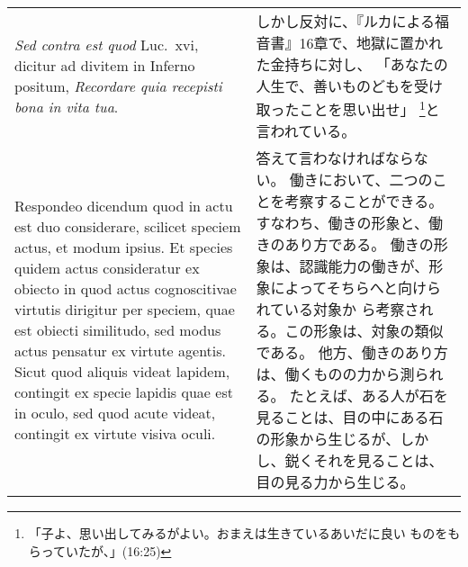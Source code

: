 \documentclass[10pt]{jsarticle} %
\begin{document}
\begin{longtable}{p{21em}p{21em}}
\\

{\it Sed contra est quod} Luc.~{\sc xvi}, dicitur ad
 divitem in Inferno positum, {\it Recordare quia recepisti bona in vita tua}.

&
しかし反対に、『ルカによる福音書』16章で、地獄に置かれた金持ちに対し、
 「あなたの人生で、善いものどもを受け取ったことを思い出せ」
 \footnote{「子よ、思い出してみるがよい。おまえは生きているあいだに良い
 ものをもらっていたが、」(16:25)}と言われている。

\\


{\sc Respondeo dicendum} quod in actu est duo considerare, scilicet
 speciem actus, et modum ipsius. Et species quidem actus consideratur ex
 obiecto in quod actus cognoscitivae virtutis
 dirigitur
 per speciem, quae
 est obiecti similitudo, sed modus actus pensatur
 ex virtute
 agentis. Sicut quod aliquis videat lapidem, contingit ex specie lapidis
 quae est in oculo, sed quod acute videat, contingit ex virtute visiva
 oculi.


&
答えて言わなければならない。
働きにおいて、二つのことを考察することができる。すなわち、働きの形象と、働
 きのあり方である。
働きの形象は、認識能力の働きが、形象によってそちらへと向けられている対象か
 ら考察される。この形象は、対象の類似である。
他方、働きのあり方は、働くものの力から測られる。
たとえば、ある人が石を見ることは、目の中にある石の形象から生じるが、しか
 し、鋭くそれを見ることは、目の見る力から生じる。



\end{longtable}
\end{document}
